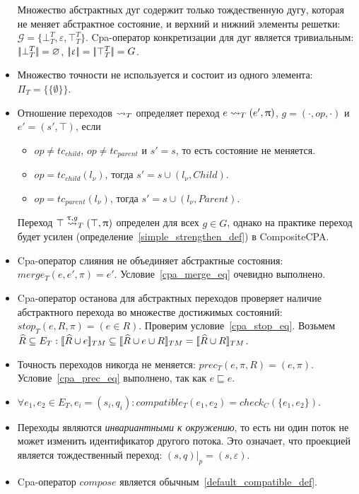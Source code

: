\begin{itemize}
Множество абстрактных дуг содержит только тождественную дугу, которая не меняет абстрактное состояние, и верхний и нижний элементы решетки: $\mathcal{G} = \{\bot^T_T, \varepsilon, \top^T_T\}$.
Cpa-оператор конкретизации для дуг является тривиальным: $\lvert \! \lvert \bot^T_T \rvert \! \rvert = \varnothing$, $\lvert \! \lvert \upvarepsilon \rvert \! \rvert = \lvert \! \lvert \top^T_T \rvert \! \rvert = G$.

\item Множество точности не используется и состоит из одного элемента: $\Pi_T = \{\{\emptyset\}\}$.

\item Отношение переходов $\leadsto_T$ определяет переход $e \leadsto_T (e', \uppi)$, $g=(\cdot,op,\cdot)$ и $e' = (s', \top)$, если 
\begin{itemize}
\item $op\neq tc_{child}$, $op\neq tc_{parent}$ и $s' = s$, то есть состояние не меняется.
\item $op=tc_{child}(l_\nu)$, тогда $s' = s \cup (l_\nu, Child)$.
\item $op=tc_{parent}(l_\nu)$, тогда $s' = s \cup (l_\nu, Parent)$.
\end{itemize}

Переход $\top \stackrel{\uptau, g}{\leadsto}_T (\top, \uppi)$ определен для всех $g\in G$, однако на практике переход будет усилен (определение~\ref{simple_strengthen_def}) в CompositeCPA.

\item Cpa-оператор слияния не объединяет абстрактные состояния: $merge_T(e, e', \pi) = e'$. Условие~\ref{cpa_merge_eq} очевидно выполнено.

\item Cpa-оператор останова для абстрактных переходов проверяет наличие абстрактного перехода во множестве достижимых состояний: $stop_T(e, R, \pi) = (e \in R)$.
Проверим условие~\ref{cpa_stop_eq}.
Возьмем $\widehat{R} \subseteq E_T: [\![ \widehat{R} \cup e ]\!]_{TM} \subseteq [\![ \widehat{R} \cup e \cup R ]\!]_{TM} = [\![ \widehat{R} \cup R ]\!]_{TM}$.

\item Точность переходов никогда не меняется: $prec_T(e, \pi, R) = (e, \pi)$. Условие~\ref{cpa_prec_eq} выполнено, так как $e \sqsubseteq e$.

\item $\forall e_1, e_2 \in E_T, e_i = (s_i, q_i):compatible_T(e_1,e_2) = check_C(\{e_1, e_2\})$.

\item Переходы являются {\em инвариантными к окружению}, то есть ни один поток не может изменить идентификатор другого потока.
Это означает, что проекцией является тождественный переход:
$(s, q)|_p = (s, \varepsilon)$.

\item Cpa-оператор $compose$ является обычным~\ref{default_compatible_def}.
\end{itemize}

